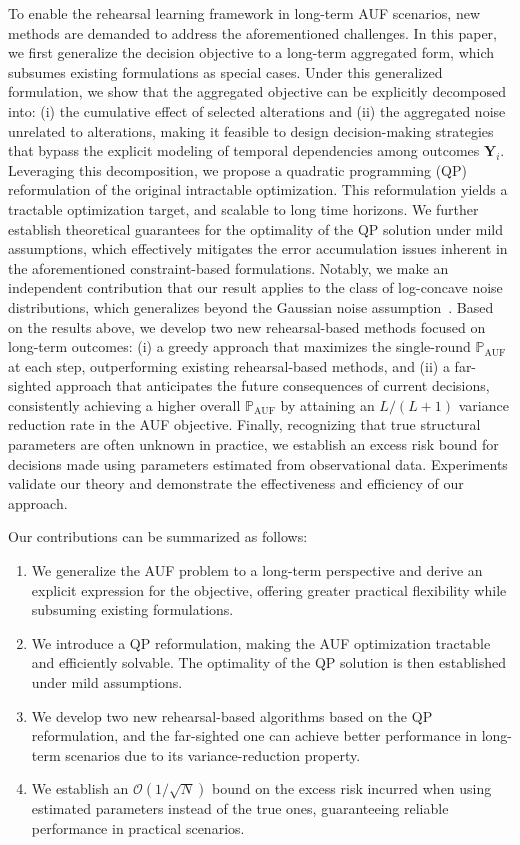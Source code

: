 \documentclass{article}
\theoremstyle{plain}
\theoremstyle{definition}
\theoremstyle{remark}
\def \Y {\mathbf{Y}}
\begin{document}
To enable the rehearsal learning framework in long-term AUF scenarios, new methods are demanded to address the aforementioned challenges.
In this paper, we first generalize the decision objective to a long-term aggregated form, which subsumes existing formulations as special cases.
Under this generalized formulation, we show that the aggregated objective can be explicitly decomposed into: (i) the cumulative effect of selected alterations and (ii) the aggregated noise unrelated to alterations, making it feasible to design decision-making strategies that bypass the explicit modeling of temporal dependencies among outcomes \(\Y_i\).
Leveraging this decomposition, we propose a quadratic programming (QP) reformulation of the original intractable optimization. This reformulation yields a tractable optimization target, and scalable to long time horizons.
We further establish theoretical guarantees for the optimality of the QP solution under mild assumptions, which effectively mitigates the error accumulation issues inherent in the aforementioned constraint-based formulations.
Notably, we make an independent contribution that our result applies to the class of log-concave noise distributions, which generalizes beyond the Gaussian noise assumption~\citep{qint2023srm,du2024micns,du2025CARE}.
Based on the results above, we develop two new rehearsal-based methods focused on long-term outcomes:
(i) a greedy approach that maximizes the single-round \(\mathbb{P}_{\operatorname{AUF}}\) at each step, outperforming existing rehearsal-based methods, and
(ii) a far-sighted approach that anticipates the future consequences of current decisions, consistently achieving a higher overall \(\mathbb{P}_{\operatorname{AUF}}\) by attaining an \(L/(L+1)\) variance reduction rate in the AUF objective.
Finally, recognizing that true structural parameters are often unknown in practice, we establish an excess risk bound for decisions made using parameters estimated from observational data. 
Experiments validate our theory and demonstrate the effectiveness and efficiency of our approach. 

Our contributions can be summarized as follows:
\vspace{-0.05in}
\begin{enumerate}[leftmargin=12pt, itemsep=0.0in]
  \item 
  We generalize the AUF problem to a long-term perspective and derive an explicit expression for the objective, offering greater practical flexibility while subsuming existing formulations.
  \item 
  We introduce a QP reformulation, making the AUF optimization tractable and efficiently solvable. The optimality of the QP solution is then established under mild assumptions.
  \item 
  We develop two new rehearsal-based algorithms based on the QP reformulation, and the far-sighted one can achieve better performance in long-term scenarios due to its variance-reduction property.
  \item 
  We establish an \(\mathcal{O}(1/\sqrt{N})\) bound on the excess risk incurred when using estimated parameters instead of the true ones, guaranteeing reliable performance in practical scenarios.
\end{enumerate}
\end{document}
